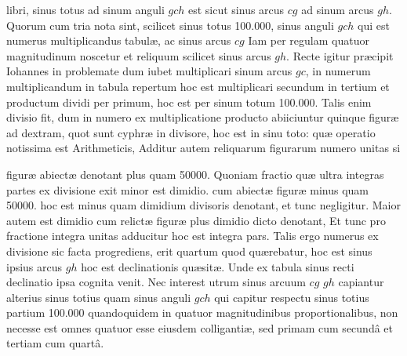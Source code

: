 \documentclass[11pt,a4paper]{article}
\begin{document}
libri, sinus totus ad sinum anguli $gch$ est sicut sinus arcus $cg$
ad sinum arcus $gh$. Quorum cum tria nota sint, scilicet sinus
totus 100.000, sinus anguli $gch$ qui est numerus multiplicandus
tabulæ, ac sinus arcus $cg$ Iam per regulam quatuor magnitudinum
noscetur et reliquum scilicet sinus arcus $gh$. Recte igitur
præcipit Iohannes in problemate dum iubet multiplicari sinum
arcus $gc$, in numerum multiplicandum in tabula repertum
hoc est multiplicari secundum in tertium et productum dividi
per primum, hoc est per sinum totum 100.000. Talis enim
divisio fit, dum in numero ex multiplicatione producto abiiciuntur
quinque figuræ ad dextram, quot sunt cyphræ in divisore,
hoc est in sinu toto: quæ operatio notissima est Arithmeticis,
Additur autem reliquarum figurarum numero unitas si

figuræ abiectæ denotant plus quam 50000. Quoniam fractio
quæ ultra integras partes ex divisione exit minor est dimidio.
cum abiectæ figuræ minus quam 50000. hoc est minus quam
dimidium divisoris denotant, et tunc negligitur. Maior
autem est dimidio cum relictæ figuræ plus dimidio dicto denotant, Et
tunc  pro fractione integra unitas adducitur hoc est integra
pars. Talis ergo numerus ex divisione sic facta progrediens, erit
quartum quod quærebatur, hoc est sinus ipsius arcus $gh$ hoc est
declinationis quæsitæ. Unde ex tabula sinus recti declinatio ipsa
cognita venit. Nec interest utrum sinus arcuum $cg$ $gh$ capiantur
alterius sinus totius quam sinus anguli $gch$ qui capitur respectu sinus
totius partium 100.000 quandoquidem in quatuor magnitudinibus
proportionalibus, non necesse est omnes quatuor esse eiusdem
colligantiæ, sed primam cum secundâ et tertiam cum quartâ.
\end{document}
